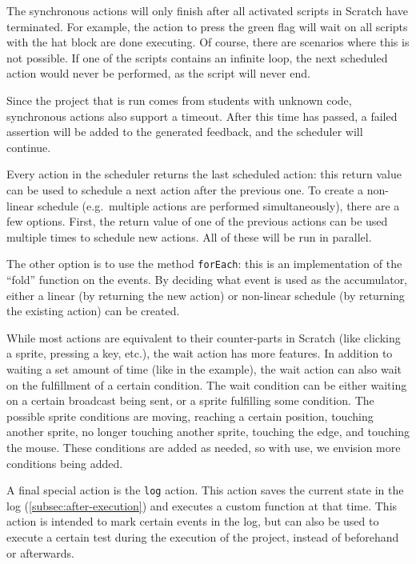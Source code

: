 \documentclass[../main]{subfiles}
\begin{document}
The synchronous actions will only finish after all activated scripts in Scratch have terminated.
For example, the action to press the green flag will wait on all scripts with the hat block  are done executing.
Of course, there are scenarios where this is not possible.
If one of the scripts contains an infinite loop, the next scheduled action would never be performed, as the script will never end.

Since the project that is run comes from students with unknown code, synchronous actions also support a timeout.
After this time has passed, a failed assertion will be added to the generated feedback, and the scheduler will continue.

Every action in the scheduler returns the last scheduled action: this return value can be used to schedule a next action after the previous one.
To create a non-linear schedule (e.g.\ multiple actions are performed simultaneously), there are a few options.
First, the return value of one of the previous actions can be used multiple times to schedule new actions.
All of these will be run in parallel.


The other option is to use the method \texttt{forEach}: this is an implementation of the ``fold'' function on the events.
By deciding what event is used as the accumulator, either a linear (by returning the new action) or non-linear schedule (by returning the existing action) can be created.

While most actions are equivalent to their counter-parts in Scratch (like clicking a sprite, pressing a key, etc.), the wait action has more features.
In addition to waiting a set amount of time (like in the example), the wait action can also wait on the fulfillment of a certain condition.
The wait condition can be either waiting on a certain broadcast being sent, or a sprite fulfilling some condition.
The possible sprite conditions are moving, reaching a certain position, touching another sprite, no longer touching another sprite, touching the edge, and touching the mouse.
These conditions are added as needed, so with use, we envision more conditions being added.

A final special action is the \texttt{log} action.
This action saves the current state in the log (\cref{subsec:after-execution}) and executes a custom function at that time.
This action is intended to mark certain events in the log, but can also be used to execute a certain test during the execution of the project, instead of beforehand or afterwards.
\end{document}
